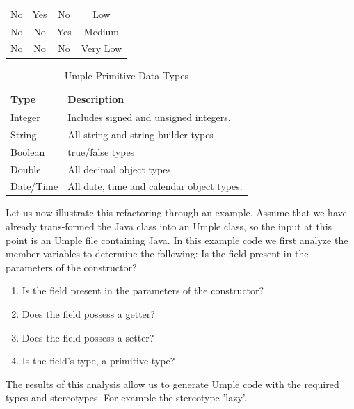 \begin{table}[h]
\begin{tabular}{@{}cccc@{}}
No                                                      & Yes                                                & No                                                 & Low                                                                                                           \\
No                                                      & No                                                 & Yes                                                & Medium                                                                                                        \\
No                                                      & No                                                 & No                                                 & Very Low                                                                                                      \\ \bottomrule
\end{tabular}
\end{table}



\begin{table}
\caption{Umple Primitive Data Types}
\label{table:attributes2}
\centering
    \begin{tabular}{ll}
		\toprule
		\rowcolor[HTML]{BBDAFF}
        \textbf{Type}      & \textbf{Description}                               \\ 
        \hline
        Integer   & Includes signed and unsigned integers.    \\ 
        String    & All string and string builder types       \\ 
        Boolean   & true/false types                          \\ 
        Double    & All decimal object types                  \\ 
        Date/Time & All date, time and calendar object types. \\
        \hline
    \end{tabular}
\end{table}


Let us now illustrate this refactoring through an example. Assume that we have already trans-formed the Java class into an Umple class, so the input at this point is an Umple file containing Java. 
In this example code we first analyze the member variables to determine the following: 
Is the field present in the parameters of the constructor?
\begin{enumerate}
\item Is the field present in the parameters of the constructor?
\item Does the field possess a getter?
\item Does the field possess a setter?
\item Is the field's type, a primitive type?
\end{enumerate}
The results of this analysis allow us to generate Umple code with the required types and stereotypes. For example the stereotype 'lazy'.

